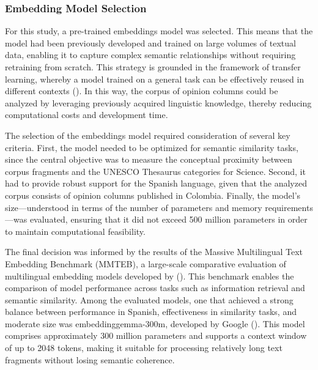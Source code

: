 \documentclass[11pt,a4paper]{article}
\begin{document}
	\subsubsection{Embedding Model Selection}
For this study, a pre-trained embeddings model was selected. This means that the model had been previously developed and trained on large volumes of textual data, enabling it to capture complex semantic relationships without requiring retraining from scratch. This strategy is grounded in the framework of transfer learning, whereby a model trained on a general task can be effectively reused in different contexts (\cite{Hosna2022}). In this way, the corpus of opinion columns could be analyzed by leveraging previously acquired linguistic knowledge, thereby reducing computational costs and development time.

The selection of the embeddings model required consideration of several key criteria. First, the model needed to be optimized for semantic similarity tasks, since the central objective was to measure the conceptual proximity between corpus fragments and the UNESCO Thesaurus categories for Science. Second, it had to provide robust support for the Spanish language, given that the analyzed corpus consists of opinion columns published in Colombia. Finally, the model’s size—understood in terms of the number of parameters and memory requirements—was evaluated, ensuring that it did not exceed 500 million parameters in order to maintain computational feasibility.

The final decision was informed by the results of the Massive Multilingual Text Embedding Benchmark (MMTEB), a large-scale comparative evaluation of multilingual embedding models developed by (\cite{enevoldsen2025mmtebmassivemultilingualtext}). This benchmark enables the comparison of model performance across tasks such as information retrieval and semantic similarity. Among the evaluated models, one that achieved a strong balance between performance in Spanish, effectiveness in similarity tasks, and moderate size was embeddinggemma-300m, developed by Google (\cite{vera2025embeddinggemmapowerfullightweighttext}). This model comprises approximately 300 million parameters and supports a context window of up to 2048 tokens, making it suitable for processing relatively long text fragments without losing semantic coherence.
\end{document}
